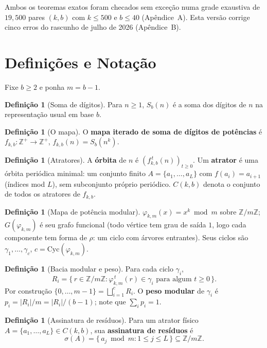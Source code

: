 \documentclass[11pt]{article}
\theoremstyle{definition}
\newtheorem{definition}[theorem]{Definição}
\theoremstyle{remark}
\newcommand{\Cyc}{\mathrm{Cyc}}
\begin{document}
Ambos os teoremas exatos foram checados sem exceção numa grade exaustiva de $19{,}500$ pares $(k,b)$ com $k \le 500$ e $b \le 40$ (Apêndice~A). Esta versão corrige cinco erros do rascunho de julho de 2026 (Apêndice~B).

\section{Definições e Notação}

Fixe $b \ge 2$ e ponha $m = b-1$.

\begin{definition}[Soma de dígitos]
Para $n \ge 1$, $S_b(n)$ é a soma dos dígitos de $n$ na representação usual em base $b$.
\end{definition}

\begin{definition}[O mapa]
O \textbf{mapa iterado de soma de dígitos de potências} é $f_{k,b}\colon \mathbb{Z}^+ \to \mathbb{Z}^+$, $f_{k,b}(n) = S_b(n^k)$.
\end{definition}

\begin{definition}[Atratores]
A \textbf{órbita} de $n$ é $(f_{k,b}^{\,t}(n))_{t \ge 0}$. Um \textbf{atrator} é uma órbita periódica minimal: um conjunto finito $A = \{a_1,\dots,a_L\}$ com $f(a_i) = a_{i+1}$ (índices mod $L$), sem subconjunto próprio periódico. $C(k,b)$ denota o conjunto de todos os atratores de $f_{k,b}$.
\end{definition}

\begin{definition}[Mapa de potência modular]
$\varphi_{k,m}(x) = x^k \bmod m$ sobre $\mathbb{Z}/m\mathbb{Z}$; $G(\varphi_{k,m})$ é seu grafo funcional (todo vértice tem grau de saída $1$, logo cada componente tem forma de $\rho$: um ciclo com árvores entrantes). Seus ciclos são $\gamma_1,\dots,\gamma_c$, $c = \Cyc(\varphi_{k,m})$.
\end{definition}

\begin{definition}[Bacia modular e peso]
Para cada ciclo $\gamma_i$,
\[
R_i = \{\, r \in \mathbb{Z}/m\mathbb{Z} : \varphi_{k,m}^{\,t}(r) \in \gamma_i \text{ para algum } t \ge 0 \,\}.
\]
Por construção $\{0,\dots,m-1\} = \bigsqcup_{i=1}^{c} R_i$. O \textbf{peso modular} de $\gamma_i$ é $p_i = |R_i|/m = |R_i|/(b-1)$; note que $\sum_i p_i = 1$.
\end{definition}

\begin{definition}[Assinatura de resíduos]
Para um atrator físico $A = \{a_1,\dots,a_L\} \in C(k,b)$, sua \textbf{assinatura de resíduos} é
\[
\sigma(A) = \{\, a_j \bmod m : 1 \le j \le L \,\} \subseteq \mathbb{Z}/m\mathbb{Z}.
\]
\end{definition}
\end{document}
